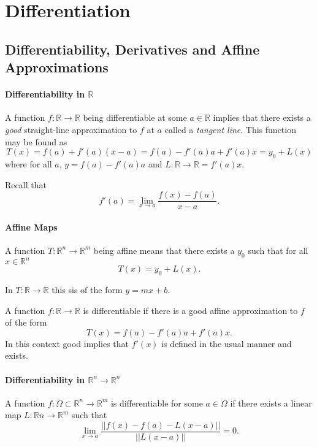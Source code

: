 
\section{Differentiation}

\subsection{Differentiability, Derivatives and Affine Approximations}

\paragraph{Differentiability in \(\mathbb{R}\)}
A function \(f: \mathbb{R}\to \mathbb{R}\) being differentiable at some \(a\in \mathbb{R}\)
implies that there exists a \textit{good} straight-line approximation to \(f\) at \(a\) called a \textit{tangent line}.
This function may be found as
\[T(x) = f(a) + f'(a)(x-a) = f(a) -f'(a)a + f'(a)x = y_0 + L(x)\]
where for all \(a\), \(y= f(a) - f'(a)a\) and \(L: \mathbb{R}\to \mathbb{R} = f'(a)x\).

Recall that \[f'(a) = \lim_{x\to a} \frac{f(x) - f(a)}{x-a}.\]

\paragraph{Affine Maps}
A function \(T: \mathbb{R}^n \to \mathbb{R}^m\) being affine means that there exists
a \(y_0\) such that for all \(x\in \mathbb{R}^n\) \[
    T(x) = y_0 + L(x)
.\]

In \(T: \mathbb{R}\to \mathbb{R}\) this sis of the form \(y = mx+b\).

A function \(f: \mathbb{R}\to \mathbb{R}\) is differentiable if there is 
a good affine approximation to \(f\) of the form
\[T(x) = f(a) - f'(a)a + f'(a)x.\]
In this context good implies that \(f'(x)\) is defined in the usual manner
and exists.

\paragraph{Differentiability in \(\mathbb{R}^n\to \mathbb{R}^n\)}

A function \(f: \Omega\subset \mathbb{R}^n \to \mathbb{R}^m\) is differentiable for some
\(a\in\Omega\) if there exists a linear map \(L: \mathbb{R}n\to \mathbb{R}^m\)
such that
\[
\lim_{x\to a} \frac{
    \left|\left|f(x) - f(a) -L(x-a)\right|\right|
} {
    \left|\left|L(x-a)\right|\right|
} = 0.
\]

